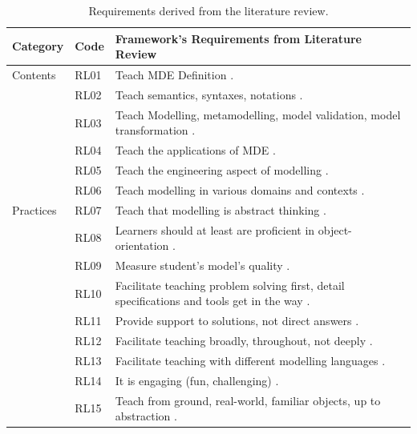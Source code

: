 \documentclass[12pt, a4paper]{report} \usepackage[titletoc]{appendix}
\begin{document}
\begin{table}[t!]\caption{Requirements derived from the literature review.}
\label{literature-review-1}
\begin{center}
\begin{tabular}{ p{1.6cm}p{1cm}p{10.4cm} } 
\hline
Category & Code & Framework's Requirements from Literature Review \\
\hline
\multirow{1}{2cm}{Contents} 
& RL01 & Teach MDE Definition \cite{borstler2012teaching}. \\ 
& RL02 & Teach semantics, syntaxes, notations \cite{borstler2012teaching}. \\ 
& RL03 & Teach Modelling, metamodelling, model validation, model transformation \cite{bezivin2009teaching, ober2007teaching}. \\
& RL04 & Teach the applications of MDE \cite{bezivin2009teaching, liebel2015ready}. \\
& RL05 & Teach the engineering aspect of modelling \cite{paige2014bad}.\\
& RL06 & Teach modelling in various domains and contexts \cite{borstler2012teaching, paige2014bad}.\\
\hline
\multirow{1}{2cm}{Practices} 
& RL07 & Teach that modelling is abstract thinking \cite{bezivin2009teaching}.\\
& RL08 & Learners should at least are proficient in object-orientation \cite{bezivin2009teaching, paige2014bad, Akayama2013}.\\
& RL09 & Measure student's model's quality \cite{Akayama2013}.\\
& RL10 & Facilitate teaching problem solving first, detail specifications and tools get in the way \cite{paige2014bad}. \\
& RL11 & Provide support to solutions, not direct answers \cite{paige2014bad}. \\ 
& RL12 & Facilitate teaching broadly, throughout, not deeply \cite{borstler2012teaching, paige2014bad, Akayama2013}.\\
& RL13 & Facilitate teaching with different modelling languages \cite{bezivin2009teaching, paige2014bad}.\\ 
& RL14 & It is engaging (fun, challenging) \cite{paige2014bad}.\\ 
& RL15 & Teach from ground, real-world, familiar objects, up to abstraction \cite{engels2005teaching}.\\ 


\end{tabular}
\end{center}
\end{table}
\end{document}
